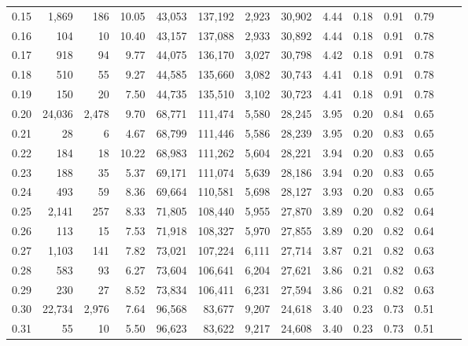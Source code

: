 \begin{tabular}{rrrrrrrrrrrrrr}
0.15 &   1,869 &    186 &   10.05 &   43,053 &  137,192 &   2,923 &  30,902 &  4.44 &  0.18 &  0.91 &      0.79 \\
0.16 &     104 &     10 &   10.40 &   43,157 &  137,088 &   2,933 &  30,892 &  4.44 &  0.18 &  0.91 &      0.78 \\
0.17 &     918 &     94 &    9.77 &   44,075 &  136,170 &   3,027 &  30,798 &  4.42 &  0.18 &  0.91 &      0.78 \\
0.18 &     510 &     55 &    9.27 &   44,585 &  135,660 &   3,082 &  30,743 &  4.41 &  0.18 &  0.91 &      0.78 \\
0.19 &     150 &     20 &    7.50 &   44,735 &  135,510 &   3,102 &  30,723 &  4.41 &  0.18 &  0.91 &      0.78 \\
0.20 &  24,036 &  2,478 &    9.70 &   68,771 &  111,474 &   5,580 &  28,245 &  3.95 &  0.20 &  0.84 &      0.65 \\
0.21 &      28 &      6 &    4.67 &   68,799 &  111,446 &   5,586 &  28,239 &  3.95 &  0.20 &  0.83 &      0.65 \\
0.22 &     184 &     18 &   10.22 &   68,983 &  111,262 &   5,604 &  28,221 &  3.94 &  0.20 &  0.83 &      0.65 \\
0.23 &     188 &     35 &    5.37 &   69,171 &  111,074 &   5,639 &  28,186 &  3.94 &  0.20 &  0.83 &      0.65 \\
0.24 &     493 &     59 &    8.36 &   69,664 &  110,581 &   5,698 &  28,127 &  3.93 &  0.20 &  0.83 &      0.65 \\
0.25 &   2,141 &    257 &    8.33 &   71,805 &  108,440 &   5,955 &  27,870 &  3.89 &  0.20 &  0.82 &      0.64 \\
0.26 &     113 &     15 &    7.53 &   71,918 &  108,327 &   5,970 &  27,855 &  3.89 &  0.20 &  0.82 &      0.64 \\
0.27 &   1,103 &    141 &    7.82 &   73,021 &  107,224 &   6,111 &  27,714 &  3.87 &  0.21 &  0.82 &      0.63 \\
0.28 &     583 &     93 &    6.27 &   73,604 &  106,641 &   6,204 &  27,621 &  3.86 &  0.21 &  0.82 &      0.63 \\
0.29 &     230 &     27 &    8.52 &   73,834 &  106,411 &   6,231 &  27,594 &  3.86 &  0.21 &  0.82 &      0.63 \\
0.30 &  22,734 &  2,976 &    7.64 &   96,568 &   83,677 &   9,207 &  24,618 &  3.40 &  0.23 &  0.73 &      0.51 \\
0.31 &      55 &     10 &    5.50 &   96,623 &   83,622 &   9,217 &  24,608 &  3.40 &  0.23 &  0.73 &      0.51 \\

\end{tabular}
